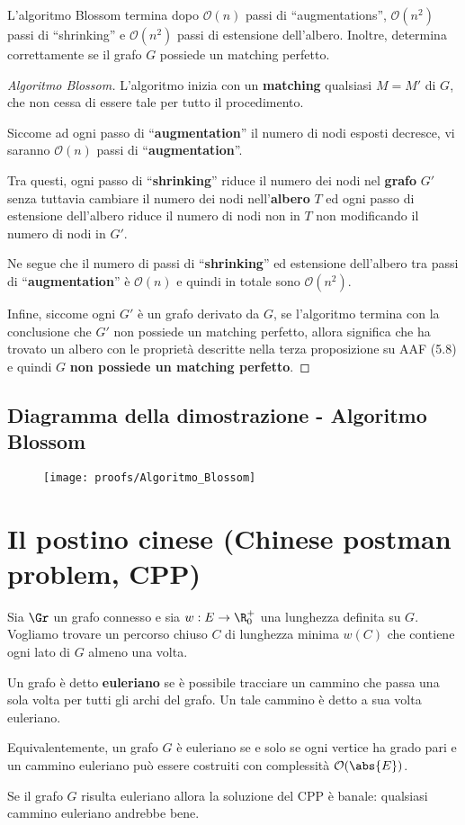\documentclass[\main/main.tex]{subfiles}
\begin{document}
\begin{theorem}
	L'algoritmo Blossom termina dopo \(\mathcal{O}(n)\) passi di ``augmentations'', \(\mathcal{O}(n^2)\) passi di ``shrinking'' e \(\mathcal{O}(n^2)\) passi di estensione dell'albero. Inoltre, determina correttamente se il grafo \(G\) possiede un matching perfetto.
\end{theorem}
\begin{proof}[Algoritmo Blossom]
	L'algoritmo inizia con un \textbf{matching} qualsiasi \(M=M'\) di \(G\), che non cessa di essere tale per tutto il procedimento.

	Siccome ad ogni passo di ``\textbf{augmentation}'' il numero di nodi esposti decresce, vi saranno \(\mathcal{O}(n)\) passi di ``\textbf{augmentation}''.

	Tra questi, ogni passo di ``\textbf{shrinking}'' riduce il numero dei nodi nel \textbf{grafo} \(G'\) senza tuttavia cambiare il numero dei nodi nell'\textbf{albero} \(T\) ed ogni passo di estensione dell'albero riduce il numero di nodi non in \(T\) non modificando il numero di nodi in \(G'\).

	Ne segue che il numero di passi di ``\textbf{shrinking}'' ed estensione dell'albero tra passi di ``\textbf{augmentation}'' è \(\mathcal{O}(n)\) e quindi in totale sono \(\mathcal{O}(n^2)\).

	Infine, siccome ogni \(G'\) è un grafo derivato da \(G\), se l'algoritmo termina con la conclusione che \(G'\) non possiede un matching perfetto, allora significa che ha trovato un albero con le proprietà descritte nella terza proposizione su AAF (5.8) e quindi \(G\) \textbf{non possiede un matching perfetto}.
\end{proof}
\clearpage
\subsection{Diagramma della dimostrazione - Algoritmo Blossom}
\begin{figure}
	\texttt{[image: proofs/Algoritmo\_Blossom]}
\end{figure}
\clearpage
\section{Il postino cinese (Chinese postman problem, CPP)}
Sia \(\Gr \) un grafo connesso e sia \(w: E \rightarrow \R^+_0\) una lunghezza definita su \(G\). Vogliamo trovare un percorso chiuso \(C\) di lunghezza minima \(w(C)\) che contiene ogni lato di \(G\) almeno una volta.
\begin{definition}
	Un grafo è detto \textbf{euleriano} se è possibile tracciare un cammino che passa una sola volta per tutti gli archi del grafo. Un tale cammino è detto a sua volta euleriano.

	Equivalentemente, un grafo \(G\) è euleriano se e solo se ogni vertice ha grado pari e un cammino euleriano può essere costruiti con complessità \(\mathcal{O}(\abs{E})\).
\end{definition}
Se il grafo \(G\) risulta euleriano allora la soluzione del CPP è banale: qualsiasi cammino euleriano andrebbe bene.
\end{document}

